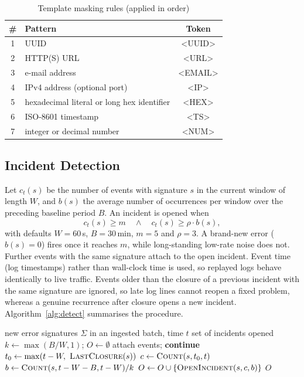 \documentclass[conference]{IEEEtran}
\begin{document}
\begin{table}[t]
\centering
\caption{Template masking rules (applied in order)}
\label{tab:masks}
\footnotesize
\begin{tabular}{@{}clc@{}}
\toprule
\# & Pattern & Token \\
\midrule
1 & UUID & \textless UUID\textgreater \\
2 & HTTP(S) URL & \textless URL\textgreater \\
3 & e-mail address & \textless EMAIL\textgreater \\
4 & IPv4 address (optional port) & \textless IP\textgreater \\
5 & hexadecimal literal or long hex identifier & \textless HEX\textgreater \\
6 & ISO-8601 timestamp & \textless TS\textgreater \\
7 & integer or decimal number & \textless NUM\textgreater \\
\bottomrule
\end{tabular}
\end{table}

\subsection{Incident Detection}
\label{sec:detect}
Let $c_t(s)$ be the number of events with signature $s$ in the current window of length $W$, and $b(s)$ the average number of occurrences per window over the preceding baseline period $B$. An incident is opened when
\begin{equation}
c_t(s) \ge m \quad\wedge\quad c_t(s) \ge \rho \cdot b(s),
\label{eq:spike}
\end{equation}
with defaults $W=60$\,s, $B=30$\,min, $m=5$ and $\rho=3$. A brand-new error ($b(s)=0$) fires once it reaches $m$, while long-standing low-rate noise does not. Further events with the same signature attach to the open incident. Event time (log timestamps) rather than wall-clock time is used, so replayed logs behave identically to live traffic. Events older than the closure of a previous incident with the same signature are ignored, so late log lines cannot reopen a fixed problem, whereas a genuine recurrence after closure opens a new incident. Algorithm~\ref{alg:detect} summarises the procedure.

\begin{algorithm}[t]
\caption{Signature-level spike detection}
\label{alg:detect}
\small
\begin{algorithmic}[1]
\Require new error signatures $\Sigma$ in an ingested batch, time $t$
\Ensure set of incidents opened
\State $k \gets \max(B/W, 1)$; \quad $O \gets \emptyset$
   attach events; \textbf{continue} \EndIf
  \State $t_0 \gets \max(t - W,\ \textsc{LastClosure}(s))$
  \State $c \gets \textsc{Count}(s, t_0, t)$
  \State $b \gets \textsc{Count}(s, t - W - B, t - W) / k$
     \State $O \gets O \cup \{\textsc{OpenIncident}(s, c, b)\}$ 
  \EndIf
\EndFor
\State \Return $O$
\end{algorithmic}
\end{algorithm}
\end{document}
